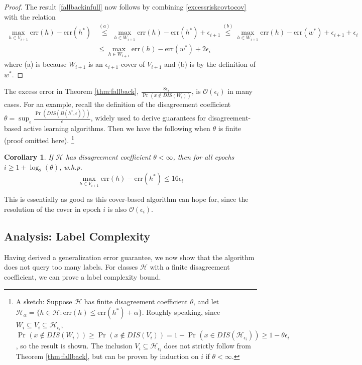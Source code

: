 \documentclass{article}[12pt]
\newtheorem{cor}[thm]{Corollary}
\theoremstyle{named}
\DeclareMathOperator{\Prtxt}{Pr}
\newcommand{\prp}[2]{\Prtxt_{#2} \left(#1\right)}
\newcommand{\err}[1]{\mbox{err}\left(#1\right)}
\newcommand{\cH}{\mathcal{H}}
\newcommand{\cO}[1]{\mathcal{O}\left(#1\right)}
\begin{document}
\begin{proof}
The result \eqref{fallbackinfull} now follows by combining \eqref{excessriskcovtocov} 
with the relation
\begin{align*}
\max_{h \in V_{i+1}} \err{h} - \err{h^*} &\stackrel{(a)}{\leq} \max_{h \in W_{i+1}} \err{h} - \err{h^*} + \epsilon_{i+1}
\stackrel{(b)}{\leq} \max_{h \in W_{i+1}} \err{h} - \err{w^*} + \epsilon_{i+1} + \epsilon_i \\
&\leq \max_{h \in W_{i+1}} \err{h} - \err{w^*} + 2 \epsilon_i 
\end{align*}
where (a) is because $W_{i+1}$ is an $\epsilon_{i+1}$-cover of $V_{i+1}$ 
and (b) is by the definition of $w^*$.
\end{proof}

The excess error in Theorem \ref{thm:fallback}, 
$\frac{8 \epsilon_i}{\prp{x \notin DIS(W_i)}{}}$, is $\cO{\epsilon_i}$ in many cases.
For an example, recall the definition of the disagreement coefficient 
$\displaystyle \theta = \sup_{\epsilon} \frac{\prp{DIS(B(h^*, \epsilon))}{}}{\epsilon}$, 
widely used to derive guarantees for disagreement-based active learning algorithms. 
Then we have the following when $\theta$ is finite (proof omitted here).
\footnote{A sketch: Suppose $\cH$ has finite disagreement coefficient $\theta$, 
and let $\cH_{\alpha} = \{ h \in \cH : \err{h} \leq \err{h^*} + \alpha \}$. 
Roughly speaking, since $W_i \subseteq V_i \subseteq \cH_{\epsilon_i}$, 
$\prp{x \notin DIS(W_i)}{} \geq \prp{x \notin DIS(V_i)}{} = 1 - \prp{x \in DIS(\cH_{\epsilon_i})}{} 
\geq 1 - \theta \epsilon_i $, 
so the result is shown. 
The inclusion $V_i \subseteq \cH_{\epsilon_i}$ does not strictly follow from Theorem \ref{thm:fallback}, 
but can be proven by induction on $i$ if $\theta < \infty$.}

\begin{cor}
\label{cor:fallbackdiscoeff}
If $\cH$ has disagreement coefficient $\theta < \infty$, then for all epochs $i \geq 1 + \log_2 (\theta)$, w.h.p.
$$ \max_{h \in V_{i+1}} \err{h} - \err{h^*} \leq 16 \epsilon_i $$
\end{cor}
  
This is essentially as good as this cover-based algorithm can hope for, 
since the resolution of the cover in epoch $i$ is also $\cO{\epsilon_i}$. 


\subsection{Analysis: Label Complexity}
\label{sec:labelanalysis}

Having derived a generalization error guarantee, 
we now show that the algorithm does not query too many labels. 
For classes $\cH$ with a finite disagreement coefficient, we can prove a label complexity bound. 
\end{document}
